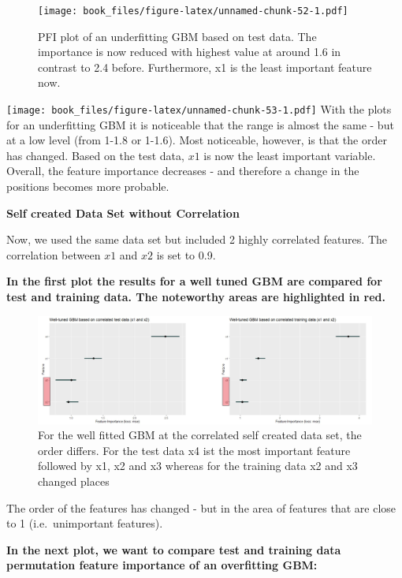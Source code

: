 \documentclass[]{krantz}
\begin{document}
\begin{figure}
\centering
\texttt{[image: book\_files/figure-latex/unnamed-chunk-52-1.pdf]}
\caption{\label{fig:unnamed-chunk-52}PFI plot of an underfitting GBM based
on test data. The importance is now reduced with highest value at around
1.6 in contrast to 2.4 before. Furthermore, x1 is the least important
feature now.}
\end{figure}

\texttt{[image: book\_files/figure-latex/unnamed-chunk-53-1.pdf]} With
the plots for an underfitting GBM it is noticeable that the range is
almost the same - but at a low level (from 1-1.8 or 1-1.6). Most
noticeable, however, is that the order has changed. Based on the test
data, \(x1\) is now the least important variable. Overall, the feature
importance decreases - and therefore a change in the positions becomes
more probable.

\textbf{Self created Data Set without Correlation}

Now, we used the same data set but included 2 highly correlated
features. The correlation between \(x1\) and \(x2\) is set to 0.9.

\textbf{In the first plot the results for a well tuned GBM are compared
for test and training data. The noteworthy areas are highlighted in
red.}

\begin{figure}
\includegraphics[width=40.4in]{images/correlated_well} \caption{For the well fitted GBM at the correlated self created data set, the order differs. For the test data x4 ist the most important feature followed by x1, x2 and x3 whereas for the training data x2 and x3 changed places}\label{fig:unnamed-chunk-54}
\end{figure}

The order of the features has changed - but in the area of features that
are close to 1 (i.e.~unimportant features).

\textbf{In the next plot, we want to compare test and training data
permutation feature importance of an overfitting GBM:}
\end{document}
